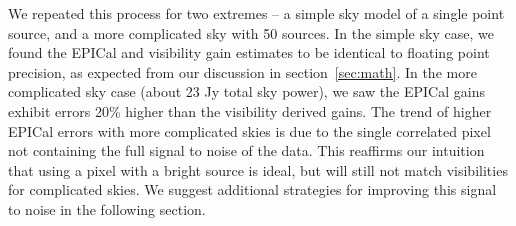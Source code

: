 \documentclass[a4paper,fleqn,usenatbib]{../mnras}
\begin{document}
We repeated this process for two extremes -- a simple sky model of a single point source, and a more complicated sky with 50 sources. In the simple sky case, we found the EPICal and visibility gain estimates to be identical to floating point precision, as expected from our discussion in section~\ref{sec:math}. In the more complicated sky case (about 23 Jy total sky power), we saw the EPICal gains exhibit errors 20\% higher than the visibility derived gains. The trend of higher EPICal errors with more complicated skies is due to the single correlated pixel not containing the full signal to noise of the data. This reaffirms our intuition that using a pixel with a bright source is ideal, but will still not match visibilities for complicated skies. We suggest additional strategies for improving this signal to noise in the following section.
\end{document}
